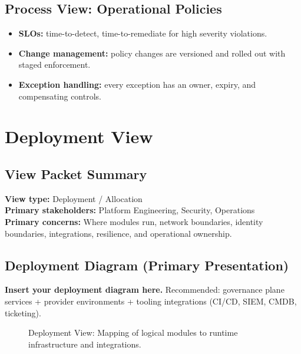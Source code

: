 \documentclass[11pt]{report}
\begin{document}
\section{Process View: Operational Policies}
\begin{itemize}
  \item \textbf{SLOs:} time-to-detect, time-to-remediate for high severity violations.
  \item \textbf{Change management:} policy changes are versioned and rolled out with staged enforcement.
  \item \textbf{Exception handling:} every exception has an owner, expiry, and compensating controls.
\end{itemize}

\clearpage

\chapter{Deployment View}
\section{View Packet Summary}
\begin{viewbox}
\textbf{View type:} Deployment / Allocation\\
\textbf{Primary stakeholders:} Platform Engineering, Security, Operations\\
\textbf{Primary concerns:} Where modules run, network boundaries, identity boundaries, integrations,
resilience, and operational ownership.
\end{viewbox}

\section{Deployment Diagram (Primary Presentation)}
\textbf{Insert your deployment diagram here.} Recommended: governance plane services + provider environments +
tooling integrations (CI/CD, SIEM, CMDB, ticketing).

\begin{figure}[htbp]
  \centering
  \caption{Deployment View: Mapping of logical modules to runtime infrastructure and integrations.}
\end{figure}
\end{document}
